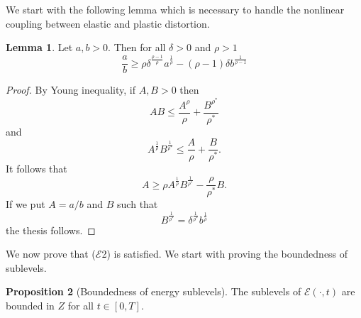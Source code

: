 \documentclass[a4paper,10pt,twoside]{amsbook}
\numberwithin{section}{chapter}
\numberwithin{equation}{chapter}
\theoremstyle{definition}
\newtheorem{prop}{Proposition}[chapter]
\newtheorem{lemma}[prop]{Lemma}
\begin{document}
We start with the following lemma which is necessary to handle the nonlinear coupling between elastic and plastic distortion.
\begin{lemma}
\label{lemma:inverse-young}
Let $a,b>0$. Then for all $\delta>0$ and $\rho>1$
\[
\frac{a}{b}\ge\rho\delta^\frac{\rho-1}{\rho}a^\frac{1}{\rho}-(\rho-1)\delta b^\frac{1}{\rho-1}
\]
\end{lemma}
\begin{proof}
By Young inequality, if $A,B>0$ then
\[
AB\le\frac{A^\rho}{\rho}+\frac{B^{\rho^*}}{\rho^*}
\]
and
\[
A^\frac{1}{\rho}B^\frac{1}{\rho^*}\le\frac{A}{\rho}+\frac{B}{\rho^*}.
\]
It follows that
\[
A\ge\rho A^\frac{1}{\rho}B^\frac{1}{\rho^*}-\frac{\rho}{\rho^*}B.
\]
If we put $A=a/b$ and $B$ such that
\[
B^\frac{1}{\rho^*}=\delta^\frac{1}{\rho^*}b^\frac{1}{\rho}
\]
the thesis follows.
\end{proof}
We now prove that ($\mathcal{E}$2) is satisfied. We start with proving the boundedness of sublevels.
\begin{prop}[Boundedness of energy sublevels]
The sublevels of $\mathcal{E}(\cdot,t)$ are bounded in $Z$ for all $t\in[0,T]$.
\end{prop}
\end{document}
